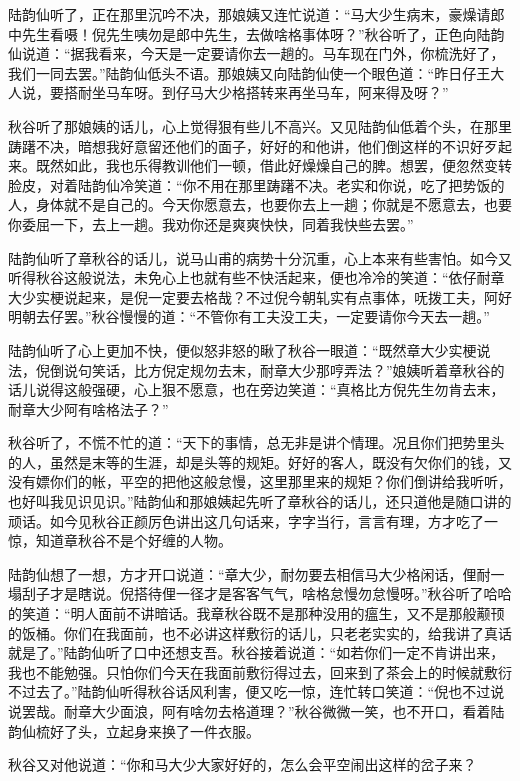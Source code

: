 \documentclass[12pt,UTF8]{ctexbook}
\begin{document}
{{{陆韵仙听了，正在那里沉吟不决，那娘姨又连忙说道：“马大少生病末，豪燥请郎中先生看嗫！倪先生咦勿是郎中先生，去做啥格事体呀？”秋谷听了，正色向陆韵仙说道：“据我看来，今天是一定要请你去一趟的。马车现在门外，你梳洗好了，我们一同去罢。”陆韵仙低头不语。那娘姨又向陆韵仙使一个眼色道：“昨日仔王大人说，要搭耐坐马车呀。到仔马大少格搭转来再坐马车，阿来得及呀？”

秋谷听了那娘姨的话儿，心上觉得狠有些儿不高兴。又见陆韵仙低着个头，在那里踌躇不决，暗想我好意留还他们的面子，好好的和他讲，他们倒这样的不识好歹起来。既然如此，我也乐得教训他们一顿，借此好燥燥自己的脾。想罢，便忽然变转脸皮，对着陆韵仙冷笑道：“你不用在那里踌躇不决。老实和你说，吃了把势饭的人，身体就不是自己的。今天你愿意去，也要你去上一趟；你就是不愿意去，也要你委屈一下，去上一趟。我劝你还是爽爽快快，同着我快些去罢。”

陆韵仙听了章秋谷的话儿，说马山甫的病势十分沉重，心上本来有些害怕。如今又听得秋谷这般说法，未免心上也就有些不快活起来，便也冷冷的笑道：“依仔耐章大少实梗说起来，是倪一定要去格哉？不过倪今朝轧实有点事体，呒拨工夫，阿好明朝去仔罢。”秋谷慢慢的道：“不管你有工夫没工夫，一定要请你今天去一趟。”

陆韵仙听了心上更加不快，便似怒非怒的瞅了秋谷一眼道：“既然章大少实梗说法，倪倒说句笑话，比方倪定规勿去末，耐章大少那哼弄法？”娘姨听着章秋谷的话儿说得这般强硬，心上狠不愿意，也在旁边笑道：“真格比方倪先生勿肯去末，耐章大少阿有啥格法子？”

秋谷听了，不慌不忙的道：“天下的事情，总无非是讲个情理。况且你们把势里头的人，虽然是末等的生涯，却是头等的规矩。好好的客人，既没有欠你们的钱，又没有嫖你们的帐，平空的把他这般怠慢，这里那里来的规矩？你们倒讲给我听听，也好叫我见识见识。”陆韵仙和那娘姨起先听了章秋谷的话儿，还只道他是随口讲的顽话。如今见秋谷正颜厉色讲出这几句话来，字字当行，言言有理，方才吃了一惊，知道章秋谷不是个好缠的人物。

陆韵仙想了一想，方才开口说道：“章大少，耐勿要去相信马大少格闲话，俚耐一塌刮子才是瞎说。倪搭待俚一径才是客客气气，啥格怠慢勿怠慢呀。”秋谷听了哈哈的笑道：“明人面前不讲暗话。我章秋谷既不是那种没用的瘟生，又不是那般颟顸的饭桶。你们在我面前，也不必讲这样敷衍的话儿，只老老实实的，给我讲了真话就是了。”陆韵仙听了口中还想支吾。秋谷接着说道：“如若你们一定不肯讲出来，我也不能勉强。只怕你们今天在我面前敷衍得过去，回来到了茶会上的时候就敷衍不过去了。”陆韵仙听得秋谷话风利害，便又吃一惊，连忙转口笑道：“倪也不过说说罢哉。耐章大少面浪，阿有啥勿去格道理？”秋谷微微一笑，也不开口，看着陆韵仙梳好了头，立起身来换了一件衣服。

秋谷又对他说道：“你和马大少大家好好的，怎么会平空闹出这样的岔子来？

}}}
\end{document}
